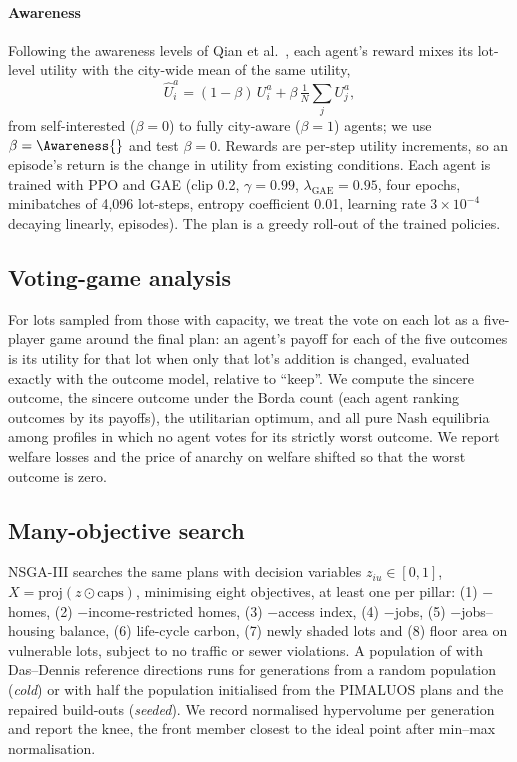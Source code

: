 \documentclass[preprint,12pt]{elsarticle}
\begin{document}
\paragraph{Awareness} Following the awareness levels of Qian et al.\ \cite{qian2023aiagent}, each agent's reward mixes its lot-level utility with the city-wide mean of the same utility,
\begin{equation}
\hat U^a_i = (1-\beta)\, U^a_i + \beta\, \tfrac1N \textstyle\sum_j U^a_j ,
\end{equation}
from self-interested ($\beta=0$) to fully city-aware ($\beta=1$) agents; we use $\beta=\Awareness{}$ and test $\beta=0$. Rewards are per-step utility increments, so an episode's return is the change in utility from existing conditions. Each agent is trained with PPO \cite{schulman2017ppo} and GAE \cite{schulman2016gae} (clip 0.2, $\gamma=0.99$, $\lambda_{\text{GAE}}=0.95$, four epochs, minibatches of 4{,}096 lot-steps, entropy coefficient 0.01, learning rate $3\times10^{-4}$ decaying linearly, \MarlIters{} episodes). The plan is a greedy roll-out of the trained policies.

\subsection{Voting-game analysis}\label{sec:game}
For \NashLots{} lots sampled from those with capacity, we treat the vote on each lot as a five-player game around the final plan: an agent's payoff for each of the five outcomes is its utility for that lot when only that lot's addition is changed, evaluated exactly with the outcome model, relative to ``keep''. We compute the sincere outcome, the sincere outcome under the Borda count (each agent ranking outcomes by its payoffs), the utilitarian optimum, and all pure Nash equilibria among profiles in which no agent votes for its strictly worst outcome. We report welfare losses and the price of anarchy \cite{koutsoupias1999worst} on welfare shifted so that the worst outcome is zero.

\subsection{Many-objective search}
NSGA-III \cite{deb2014nsga3,blank2020pymoo} searches the same plans with decision variables $z_{iu}\in[0,1]$, $X=\mathrm{proj}(z\odot\mathrm{caps})$, minimising eight objectives, at least one per pillar: (1) $-$homes, (2) $-$income-restricted homes, (3) $-$access index, (4) $-$jobs, (5) $-$jobs--housing balance, (6) life-cycle carbon, (7) newly shaded lots and (8) floor area on vulnerable lots, subject to no traffic or sewer violations. A population of \ParetoPop{} with \ParetoRefDirs{} Das--Dennis reference directions runs for \ParetoGen{} generations from a random population (\emph{cold}) or with half the population initialised from the PIMALUOS plans and the repaired build-outs (\emph{seeded}). We record normalised hypervolume per generation and report the knee, the front member closest to the ideal point after min--max normalisation.
\end{document}
